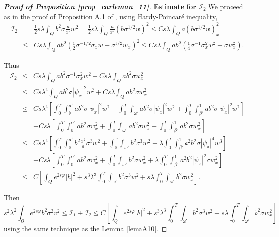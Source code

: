 \documentclass[11pt,oneside,a4papper]{osajnl}
\begin{document}
\begin{proof}[\bf Proof of Proposition \ref{prop_carleman_11}]
    {\bf Estimate for $\mathcal{I}_2$}
    We proceed as in the proof of Proposition A.1 of \cite{DemarqueLimacoViana_deg_eq2018}, using Hardy-Poincaré inequality,
    \begin{eqnarray*}
            \mathcal{I}_2&=&\frac{1}{2}s\lambda\int_Qb^2\sigma \frac{a}{x^2}w^2=\frac{1}{2}s\lambda\int_Q \frac{a}{x^2}(b\sigma^{1/2}w)^2\leq C s\lambda\int_Q a(b\sigma^{1/2}w)_x^2\\
            &\leq &C s\lambda\int_Q ab^2\left( \frac{1}{2}\sigma^{-1/2}\sigma_x w+\sigma^{1/2}w_x  \right)^2\leq C s\lambda\int_Q ab^2\left( \frac{1}{4}\sigma^{-1}\sigma_x^2 w^2+\sigma w_x^2  \right).
    \end{eqnarray*}
    
    Thus
    \begin{eqnarray*}
            \mathcal{I}_2&\leq &C s\lambda\int_Q ab^2\sigma^{-1}\sigma_x^2 w^2+C s\lambda\int_Q ab^2\sigma w_x^2\\
            &\leq &C s\lambda^3\int_Q ab^2 \sigma |\psi_x|^2 w^2+C s\lambda\int_Q ab^2\sigma w_x^2\\
            &\leq &C s\lambda^3 \left[\int_0^T \int_0^{\alpha'} ab^2 \sigma |\psi_x|^2 w^2 +  \int_0^T\int_{\omega'} ab^2 \sigma |\psi_x|^2 w^2 + \int_0^T \int_{\beta'}^1ab^2 \sigma |\psi_x|^2 w^2\right]\\
            && +C s\lambda \left[\int_0^T \int_0^{\alpha'} ab^2\sigma w_x^2 +  \int_0^T\int_{\omega'} ab^2\sigma w_x^2 + \int_0^T \int_{\beta'}^1ab^2\sigma w_x^2 \right]\\
            &\leq &C s\lambda^3 \left[\int_0^T \int_0^{\alpha'} b^2 \frac{x^2}{a}\sigma^3  w^2 +  \int_0^T\int_{\omega'} b^2 \sigma^3 w^2 +\lambda \int_0^T \int_{\beta'}^1a^2b^2 \sigma |\psi_x|^4 w^3\right]\\
            && +C s\lambda \left[\int_0^T \int_0^{\alpha'} ab^2\sigma w_x^2 +  \int_0^T\int_{\omega'} b^2\sigma w_x^2 + \lambda\int_0^T \int_{\beta'}^1a^2b^2|\psi_x|^2\sigma w_x^2 \right]\\
            &\leq& C\left[ \int_Q e^{2s\varphi} |h|^2 + s^3\lambda^3 \int_0^T \int_{\omega'} b^2\sigma^3 w^2 + s\lambda \int_0^T \int_{\omega'} b^2\sigma w_x^2  \right].
	\end{eqnarray*}
    
	Then
	$$s^2\lambda^2\int_Qe^{2s\varphi}b^2\sigma^2v^2\leq \mathcal{I}_1+\mathcal{I}_2\leq C\left[ \int_Q e^{2s\varphi} |h|^2 + s^3\lambda^3 \int_0^T \int_{\omega'} b^2\sigma^3 w^2 + s\lambda \int_0^T \int_{\omega'} b^2\sigma w_x^2  \right]$$
	using the same technique as the Lemma \ref{lemaA10}.
\end{proof}
\end{document}

